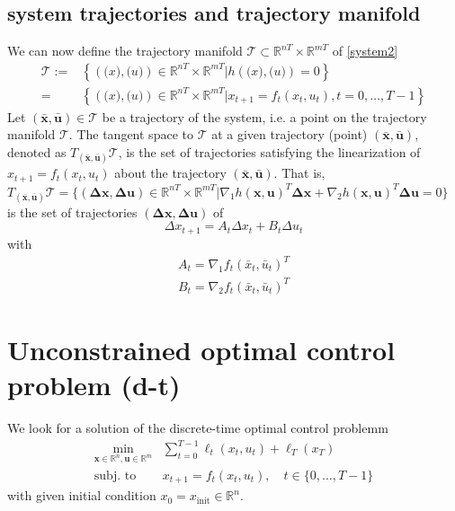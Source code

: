 \documentclass[openany]{book}
\newcommand{\R}{\mathbb{R}} %
\newcommand{\traj}{(\bar{\mathbf{x}},\bar{\mathbf{u}})} %
\theoremstyle{definition}
\theoremstyle{remark}
\begin{document}
\subsection{system trajectories and trajectory manifold}
We can now define the trajectory manifold $\mathcal{T}\subset \R^{nT}\times \R^{mT}$ of \eqref{system2}
\begin{align*}
    \mathcal{T} := &\left\{\left(\mathbf(x),\mathbf(u)\right)\in\R^{nT}\times\R^{mT}|h\left(\mathbf(x),\mathbf(u)\right)=0\right\}\\=&\left\{\left(\mathbf(x),\mathbf(u)\right)\in\R^{nT}\times\R^{mT}|x_{t+1}=f_t\left(x_t,u_t\right),t=0,\dots,T-1\right\}
\end{align*}
Let $\traj\in\mathcal{T}$ be a trajectory of the system, i.e. a point on the trajectory manifold $\mathcal{T}$. The tangent space to $\mathcal{T}$ at a given trajectory (point) $\traj$, denoted as $T_{(\bar{\mathbf{x}},\bar{\mathbf{u}})}\mathcal{T}$, is the set of trajectories satisfying the linearization of $x_{t+1} = f_t(x_t,u_t)$ about the trajectory $(\bar{\mathbf{x}},\bar{\mathbf{u}})$.
That is, $T_{(\bar{\mathbf{x}},\bar{\mathbf{u}})}\mathcal{T}=\{(\mathbf{\Delta x, \Delta u})\in\R^{nT}\times\R^{mT}|\nabla_1h(\mathbf{x},\mathbf{u})^T\mathbf{\Delta x} + \nabla_2h(\mathbf{x},\mathbf{u})^T\mathbf{\Delta u} = 0\}$ is the set of trajectories $(\mathbf{\Delta x, \Delta u})$ of
\[
    \Delta x_{t+1} = A_t\Delta x_t + B_t \Delta u_t
\]
with 
\begin{gather*}
    A_t = \nabla_1f_t(\bar{x}_t,\bar{u}_t)^T\\
    B_t = \nabla_2f_t(\bar{x}_t,\bar{u}_t)^T
\end{gather*}


\section{Unconstrained optimal control problem (d-t)}
We look for a solution of the discrete-time optimal control problemm 
\begin{align*}
        \min_{\mathbf{x}\in\R^n,\mathbf{u}\in\R^m} & \displaystyle\sum_{t=0}^{T-1}\ell_t(x_t,u_t)+\ell_T(x_T)\\
        \text{subj. to } & x_{t+1} = f_t(x_t,u_t), \quad t\in\{0,\dots,T-1\} 
\end{align*}
with given initial condition $x_0 = x_{\text{init}}\in \R^n$. 
\end{document}

